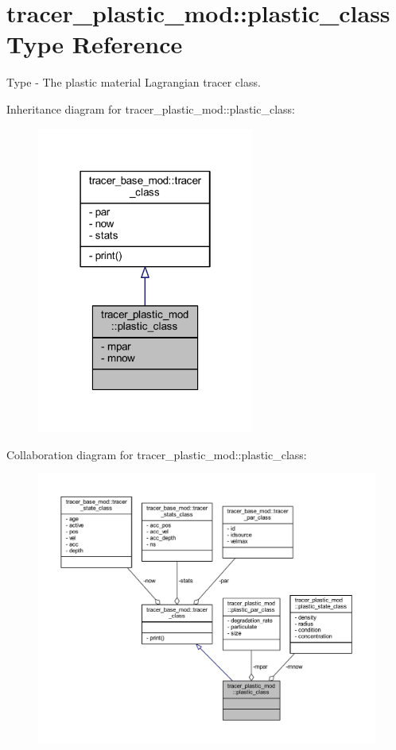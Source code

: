 \hypertarget{structtracer__plastic__mod_1_1plastic__class}{}\section{tracer\+\_\+plastic\+\_\+mod\+:\+:plastic\+\_\+class Type Reference}
\label{structtracer__plastic__mod_1_1plastic__class}


Type -\/ The plastic material Lagrangian tracer class.  




Inheritance diagram for tracer\+\_\+plastic\+\_\+mod\+:\+:plastic\+\_\+class\+:\nopagebreak
\begin{figure}[H]
\begin{center}
\leavevmode
\includegraphics[width=202pt]{structtracer__plastic__mod_1_1plastic__class__inherit__graph}
\end{center}
\end{figure}


Collaboration diagram for tracer\+\_\+plastic\+\_\+mod\+:\+:plastic\+\_\+class\+:\nopagebreak
\begin{figure}[H]
\begin{center}
\leavevmode
\includegraphics[width=350pt]{structtracer__plastic__mod_1_1plastic__class__coll__graph}
\end{center}
\end{figure}
